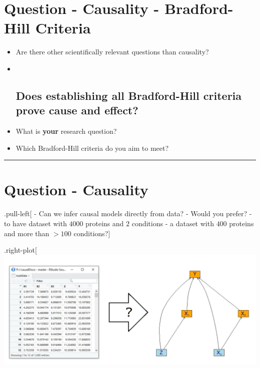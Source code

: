 \documentclass[]{article}
\begin{document}
\hypertarget{question---causality---bradford-hill-criteria-1}{%
\section{Question - Causality - Bradford-Hill
Criteria}\label{question---causality---bradford-hill-criteria-1}}

\begin{itemize}
\item
  Are there other scientifically relevant questions than causality?
\item ~
  \hypertarget{does-establishing-all-bradford-hill-criteria-prove-cause-and-effect}{%
  \subsection{Does establishing all Bradford-Hill criteria prove cause
  and
  effect?}\label{does-establishing-all-bradford-hill-criteria-prove-cause-and-effect}}
\item
  What is \textbf{your} research question?
\item
  Which Bradford-Hill criteria do you aim to meet?
\end{itemize}

\begin{center}\rule{0.5\linewidth}{\linethickness}\end{center}

\hypertarget{question---causality-1}{%
\section{Question - Causality}\label{question---causality-1}}

.pull-left{[} - Can we infer causal models directly from data? - Would
you prefer? - to have dataset with \(4000\) proteins and \(2\)
conditions - a dataset with \(400\) proteins and more than \(>100\)
conditions?{]}

.right-plot{[} \includegraphics{../inst/images/Causality_fromData.jpg}
\end{document}
